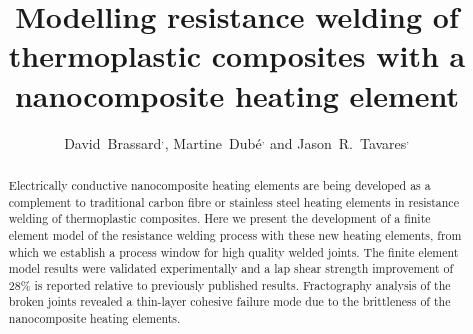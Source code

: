 \documentclass[review,times,sagev,doublespace]{sagej}
\begin{document}


\title{Modelling resistance welding of thermoplastic composites with a nanocomposite heating element}

\author{David~Brassard$^,$,
	Martine~Dubé$^,$ and
	Jason~R.~Tavares$^,$}



\begin{abstract}

Electrically conductive nanocomposite heating elements are being developed as a complement to traditional carbon fibre or stainless steel heating elements in resistance welding of thermoplastic composites. 
Here we present the development of a finite element model of the resistance welding process with these new heating elements, from which we establish a process window for high quality welded joints. 
The finite element model results were validated experimentally and a lap shear strength improvement of 28\% is reported relative to previously published results. 
Fractography analysis of the broken joints revealed a thin-layer cohesive failure mode due to the brittleness of the nanocomposite heating elements. 

\end{abstract}


\maketitle
\end{document}
